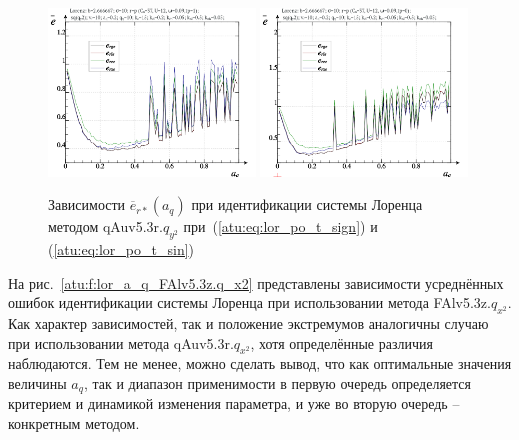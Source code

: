 \begin{figure}[h!]
  \centerline{
    \includegraphics[width=0.49\textwidth]{p/cha/lor/qAuv5.3r/lor_qAuv5_3r_qy2-p_a_q_e_sign.png}
    \hfill
    \includegraphics[width=0.49\textwidth]{p/cha/lor/qAuv5.3r/lor_qAuv5_3r_qy2-p_a_q_e_sin.png}
  }
  \caption{Зависимости $\overline{e}_{r*}(a_q)$ при идентификации системы Лоренца методом qAuv5.3r.$q_{y^2}$
   при~(\ref{atu:eq:lor_po_t_sign}) и (\ref{atu:eq:lor_po_t_sin})}
  \label{atu:f:lor_a_q_qAuv5.3r.q_y2}
\end{figure}


На рис.~\ref{atu:f:lor_a_q_FAlv5.3z.q_x2} представлены зависимости
усреднённых ошибок идентификации системы Лоренца при использовании метода FAlv5.3z.$q_{x^2}$.
Как характер зависимостей, так и положение экстремумов аналогичны
случаю при использовании метода  qAuv5.3r.$q_{x^2}$,
хотя определённые различия наблюдаются. Тем не менее,
можно сделать вывод, что как оптимальные значения величины $a_q$,
так и диапазон применимости в первую очередь определяется
критерием и динамикой изменения параметра, и уже во вторую очередь --
конкретным методом.


